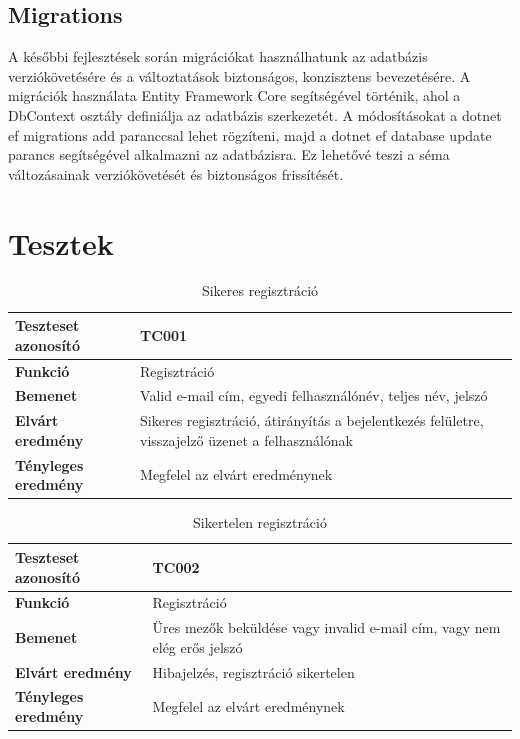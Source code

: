 \subsection{Migrations}
A későbbi fejlesztések során migrációkat használhatunk az adatbázis verziókövetésére és a változtatások biztonságos, konzisztens bevezetésére. A migrációk használata Entity Framework Core segítségével történik, ahol a DbContext osztály definiálja az adatbázis szerkezetét. A módosításokat a dotnet ef migrations add paranccsal lehet rögzíteni, majd a dotnet ef database update parancs segítségével alkalmazni az adatbázisra. Ez lehetővé teszi a séma változásainak verziókövetését és biztonságos frissítését.

\section{Tesztek}
\begin{table}[h!]
	\centering
	\begin{tabular}{|l|p{10cm}|}
		\hline
		\textbf{Teszteset azonosító} & TC001 \\ \hline
		\textbf{Funkció} & Regisztráció \\ \hline
		\textbf{Bemenet} & Valid e-mail cím, egyedi felhasználónév, teljes név, jelszó \\ \hline
		\textbf{Elvárt eredmény} & Sikeres regisztráció, átirányítás a bejelentkezés felületre, visszajelző üzenet a felhasználónak \\ \hline
		\textbf{Tényleges eredmény} & Megfelel az elvárt eredménynek\\ \hline
	\end{tabular}
	\caption{Sikeres regisztráció}
	\label{tab:manual_testcase_registration}
\end{table}
\begin{table}[h!]
	\centering
	\begin{tabular}{|l|p{10cm}|}
		\hline
		\textbf{Teszteset azonosító} & TC002 \\ \hline
		\textbf{Funkció} & Regisztráció \\ \hline
		\textbf{Bemenet} & Üres mezők beküldése vagy invalid e-mail cím, vagy nem elég erős jelszó \\ \hline
		\textbf{Elvárt eredmény} & Hibajelzés, regisztráció sikertelen \\ \hline
		\textbf{Tényleges eredmény} & Megfelel az elvárt eredménynek \\ \hline
	\end{tabular}
	\caption{Sikertelen regisztráció}
	\label{tab:regisztracio_ures}
\end{table}

